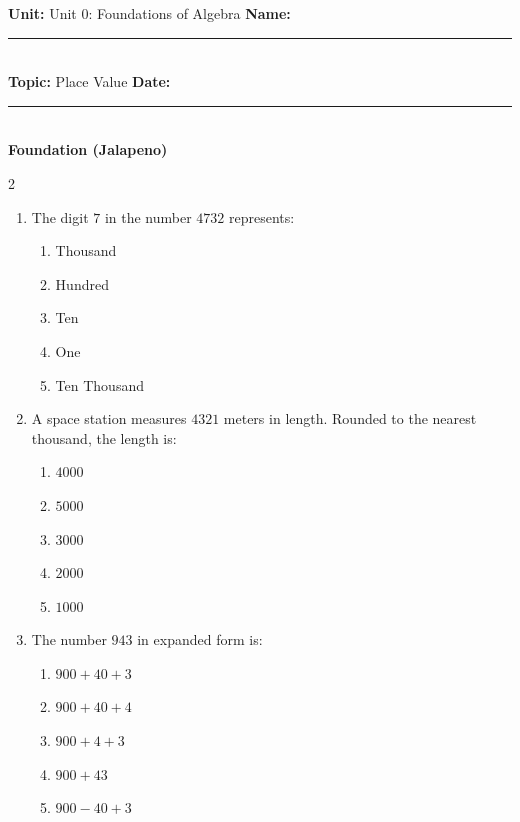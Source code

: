 \documentclass[10pt]{article}
\begin{document}
\enlargethispage{2.5cm}

\begin{tcolorbox}[colback=mainblue!5, colframe=mainblue, sharp corners, boxrule=0.5pt]
    \small \textbf{Unit:} Unit 0: Foundations of Algebra \hfill \textbf{Name:} \rule{3cm}{0.4pt} \\
    \small \textbf{Topic:} Place Value \hfill \textbf{Date:} \rule{2cm}{0.4pt} \\
    \centering \textbf{\large Foundation (Jalapeno)}
\end{tcolorbox}

\vspace{0.2cm}

\begin{multicols}{2}
\begin{enumerate}[label=\textbf{Q\arabic*.}, leftmargin=*, itemsep=6pt, parsep=0pt]

  \item \small The digit $7$ in the number $4732$ represents:
  \begin{enumerate}[label=(\Alph*), leftmargin=0.6cm, nosep, itemsep=2pt]
    \item Thousand
    \item Hundred
    \item Ten
    \item One
    \item Ten Thousand
  \end{enumerate}

  \item \small A space station measures $4321$ meters in length. Rounded to the nearest thousand, the length is:
  \begin{enumerate}[label=(\Alph*), leftmargin=0.6cm, nosep, itemsep=2pt]
    \item $4000$
    \item $5000$
    \item $3000$
    \item $2000$
    \item $1000$
  \end{enumerate}

  \item \small The number $943$ in expanded form is:
  \begin{enumerate}[label=(\Alph*), leftmargin=0.6cm, nosep, itemsep=2pt]
    \item $900 + 40 + 3$
    \item $900 + 40 + 4$
    \item $900 + 4 + 3$
    \item $900 + 43$
    \item $900 - 40 + 3$
  \end{enumerate}


\end{enumerate}
\end{multicols}
\end{document}
